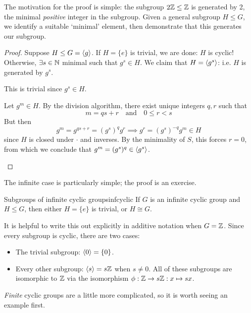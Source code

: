 The motivation for the proof is simple: the subgroup $2\mathbb{Z}\le\mathbb{Z}$ is generated by 2, the minimal \emph{positive} integer in the subgroup. Given a general subgroup $H\le G$, we identify a suitable `minimal' element, then demonstrate that this generates our subgroup.

\begin{proof}
Suppose $H\le G=\left\langle g\right\rangle$. If $H=\{e\}$ is trivial, we are done: $H$ is cyclic!\smallbreak
Otherwise, $\exists s\in\mathbb{N}$ minimal such that $g^s\in H$. We claim that $H=\left\langle g^s\right\rangle$: i.e. $H$ is generated by $g^s$.
\begin{description}\itemsep0pt
	\item[$\bigl(\ip{g^s}\subseteq H\bigr)$] This is trivial since $g^s\in H$.
	\item[$\bigl(H\subseteq \ip{g^s}\bigr)$] Let $g^m\in H$. By the division algorithm, there exist unique integers $q,r$ such that
	\[m=qs+r\quad\text{and}\quad 0\le r<s\]
	But then
	\[g^m=g^{qs+r}=(g^s)^qg^r\implies g^r=(g^s)^{-q}g^m\in H\]
	since $H$ is closed under $\cdot$ and inverses. By the minimality of $S$, this forces $r=0$, from which we conclude that $g^m=(g^s)^q\in\left\langle g^s\right\rangle$.\qedhere 
\end{description}
\end{proof}

\goodbreak

The infinite case is particularly simple; the proof is an exercise.

\begin{cor}{Subgroups of infinite cyclic groups}{infcyclic}
If $G$ is an infinite cyclic group and $H\le G$, then either $H=\{e\}$ is trivial, or $H\cong G$.
\end{cor}


\begin{example}{}{}
It is helpful to write this out explicitly in additive notation when $G=\mathbb{Z}$. Since every subgroup is cyclic, there are two cases:\begin{itemize}
  \item The trivial subgroup: $\left\langle 0\right\rangle=\{0\}$.
  \item Every other subgroup: $\left\langle s\right\rangle=s\mathbb{Z}$ when $s\neq 0$. All of these subgroups are isomorphic to $\mathbb{Z}$ via the isomorphism $\phi:\mathbb{Z}\to s\mathbb{Z}:x\mapsto sx$.
\end{itemize}
\end{example}

\medskip


\emph{Finite} cyclic groups are a little more complicated, so it is worth seeing an example first.

